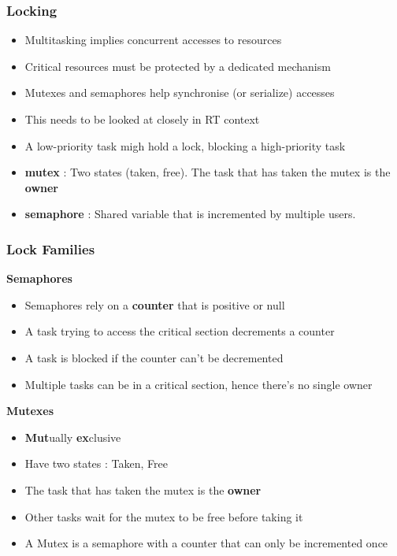 \begin{frame}
  \frametitle{Locking}
	\begin{itemize}
		\item Multitasking implies concurrent accesses to resources
		\item Critical resources must be protected by a dedicated mechanism
		\item Mutexes and semaphores help synchronise (or serialize) accesses
		\item This needs to be looked at closely in RT context
		\item A low-priority task migh hold a lock, blocking a high-priority task
	\end{itemize}
	\begin{itemize}
		\item \textbf{mutex} : Two states (taken, free). The task that has taken the mutex is the \textbf{owner}
		\item \textbf{semaphore} : Shared variable that is incremented by multiple users.
	\end{itemize}
\end{frame}

\begin{frame}
	\frametitle{Lock Families}
		\begin{center}\textbf{Semaphores}\end{center}
		\begin{itemize}
			\item Semaphores rely on a \textbf{counter} that is positive or null
			\item A task trying to access the critical section decrements a counter
			\item A task is blocked if the counter can't be decremented
			\item Multiple tasks can be in a critical section, hence there's no single owner
		\end{itemize}
		\begin{center}\textbf{Mutexes}\end{center}
		\begin{itemize}
			\item \textbf{Mut}ually \textbf{ex}clusive
			\item Have two states : Taken, Free
			\item The task that has taken the mutex is the \textbf{owner}
			\item Other tasks wait for the mutex to be free before taking it
			\item A Mutex is a semaphore with a counter that can only be incremented once
		\end{itemize}


\end{frame}

